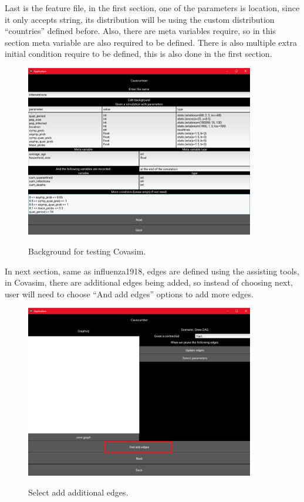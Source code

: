 Last is the feature file, in the first section, one of the parameters is location, since it only accepts string, its distribution will be using the custom distribution “countries” defined before. Also, there are meta variables require, so in this section meta variable are also required to be defined. There is also multiple extra initial condition require to be defined, this is also done in the first section.
\begin{figure}[H]
	\centering
	\includegraphics[width=10cm]{figures/CovasimTestProcess3.png}\\
	\caption{Background for testing Covasim.}
	\label{fig:figure36}
\end{figure}
In next section, same as influenza1918, edges are defined using the assisting tools, in Covasim, there are additional edges being added, so instead of choosing next, user will need to choose “And add edges” options to add more edges.
\begin{figure}[H]
	\centering
	\includegraphics[width=10cm]{figures/CovasimTestProcess4.png}\\
	\caption{Select add additional edges.}
	\label{fig:figure37}
\end{figure}
